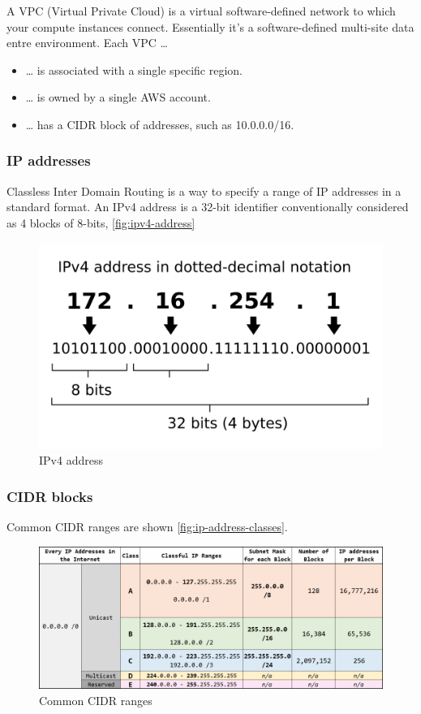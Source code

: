 A VPC (Virtual Private Cloud)  is a virtual software-defined network to which your compute instances connect.
Essentially it's a software-defined multi-site data entre environment.
Each VPC \ldots{}

\begin{itemize}
\item
  \ldots{} is associated with a single specific region.
\item
  \ldots{} is owned by a single AWS account.
\item
  \ldots{} has a CIDR block of addresses, such as 10.0.0.0/16.
\end{itemize}

\subsubsection{IP addresses}

Classless Inter Domain Routing is a way to specify a range of IP addresses in a standard format.
An IPv4 address is a 32-bit identifier conventionally considered as 4 blocks of 8-bits, \autoref{fig:ipv4-address}

\begin{figure}[htbp]
  \centering
  \includegraphics[width=0.5\linewidth]{ipv4_address}
  \caption{IPv4 address}
  \label{fig:ipv4-address}
\end{figure}

\subsubsection{CIDR blocks}

Common CIDR ranges are shown \autoref{fig:ip-address-classes}.

\begin{figure}[htbp]
  \centering
  \includegraphics[width=1.0\linewidth]{ip_address_classes}
  \caption{Common CIDR ranges}
  \label{fig:ip-address-classes}
\end{figure}

